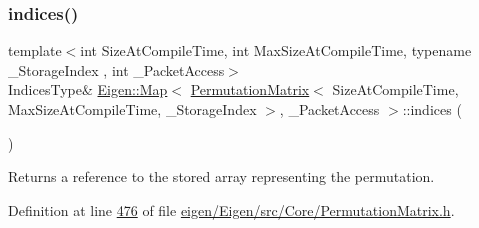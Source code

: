 \mbox{\label{class_eigen_1_1_map_3_01_permutation_matrix_3_01_size_at_compile_time_00_01_max_size_at_compile_2f9d18bf0084dbfb13fbbfe14adaf22d_af9771ec7bda9dfc5c5a6cc9857410c4c}} 
\subsubsection{\texorpdfstring{indices()}{indices()}\hspace{0.1cm}{\footnotesize\ttfamily [3/4]}}
{\footnotesize\ttfamily template$<$int Size\+At\+Compile\+Time, int Max\+Size\+At\+Compile\+Time, typename \+\_\+\+Storage\+Index , int \+\_\+\+Packet\+Access$>$ \\
Indices\+Type\& \hyperlink{group___core___module_class_eigen_1_1_map}{Eigen\+::\+Map}$<$ \hyperlink{group___core___module_class_eigen_1_1_permutation_matrix}{Permutation\+Matrix}$<$ Size\+At\+Compile\+Time, Max\+Size\+At\+Compile\+Time, \+\_\+\+Storage\+Index $>$, \+\_\+\+Packet\+Access $>$\+::indices (\begin{DoxyParamCaption}{ }\end{DoxyParamCaption})\hspace{0.3cm}{\ttfamily [inline]}}

\begin{DoxyReturn}{Returns}
a reference to the stored array representing the permutation. 
\end{DoxyReturn}


Definition at line \hyperlink{eigen_2_eigen_2src_2_core_2_permutation_matrix_8h_source_l00476}{476} of file \hyperlink{eigen_2_eigen_2src_2_core_2_permutation_matrix_8h_source}{eigen/\+Eigen/src/\+Core/\+Permutation\+Matrix.\+h}.

